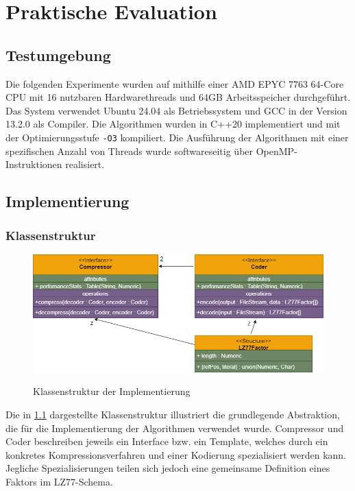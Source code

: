 \chapter{Praktische Evaluation}

\section{Testumgebung}
Die folgenden Experimente wurden auf mithilfe einer AMD EPYC 7763 64-Core CPU mit 16 nutzbaren Hardwarethreads und 64GB Arbeitsspeicher durchgeführt. Das System
verwendet Ubuntu 24.04 als Betriebssystem und GCC in der Version 13.2.0 als Compiler. Die Algorithmen wurden in C++20 implementiert und mit der Optimierungsstufe
\texttt{-O3} kompiliert. Die Ausführung der Algorithmen mit einer spezifischen Anzahl von Threads wurde softwareseitig über OpenMP-Instruktionen realisiert. 

\section{Implementierung}

\subsection{Klassenstruktur}
\begin{figure}[ht]
    \centering
    \caption{Klassenstruktur der Implementierung}
    \includegraphics[scale=0.4]{Images/uml.png} \label{uml}
\end{figure}

Die in \ref{uml} dargestellte Klassenstruktur illustriert die grundlegende Abstraktion, die für die Implementierung der Algorithmen verwendet wurde. Compressor und
Coder beschreiben jeweils ein Interface bzw. ein Template, welches durch ein konkretes Kompressionsverfahren und einer Kodierung spezialisiert werden kann. Jegliche
Spezialisierungen teilen sich jedoch eine gemeinsame Definition eines Faktors im LZ77-Schema.

